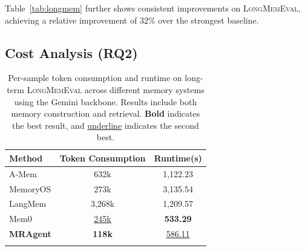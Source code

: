 Table~\ref{tab:longmem} further shows consistent improvements on \textsc{LongMemEval}, achieving a relative improvement of $32\%$ over the strongest baseline.




\subsection{Cost Analysis (RQ2)}




\begin{table}[t]
\centering
\small
\setlength{\tabcolsep}{6pt}
\caption{Per-sample token consumption and runtime on long-term
\textsc{LongMemEval} across different memory systems using the Gemini backbone.
Results include both memory construction and retrieval.
\textbf{Bold} indicates the best result, and \underline{underline} indicates the
second best.}
\begin{tabular}{lcc}
\toprule
Method & Token Consumption & Runtime(s) \\
\midrule
A-Mem     & 632k              & 1,122.23 \\
MemoryOS & 273k              & 3,135.54 \\
LangMem  & 3,268k             & 1,209.57 \\
Mem0     & \underline{245k}  & \textbf{533.29} \\
\textbf{MRAgent} & \textbf{118k} & \underline{586.11} \\
\bottomrule
\label{tab:token-consumption}
\end{tabular}
\end{table}



